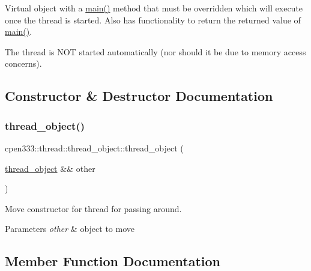 Virtual object with a \hyperlink{classcpen333_1_1thread_1_1thread__object_adbd74f6f7461d90a1c12e8078aa5f3af}{main()} method that must be overridden which will execute once the thread is started. Also has functionality to return the returned value of \hyperlink{classcpen333_1_1thread_1_1thread__object_adbd74f6f7461d90a1c12e8078aa5f3af}{main()}.

The thread is N\+OT started automatically (nor should it be due to memory access concerns). 

\subsection{Constructor \& Destructor Documentation}
\mbox{\label{classcpen333_1_1thread_1_1thread__object_adb6e805de4cf351471b100fe18254255}} 
\subsubsection{\texorpdfstring{thread\+\_\+object()}{thread\_object()}}
{\footnotesize\ttfamily cpen333\+::thread\+::thread\+\_\+object\+::thread\+\_\+object (\begin{DoxyParamCaption}\item[{\hyperlink{classcpen333_1_1thread_1_1thread__object}{thread\+\_\+object} \&\&}]{other }\end{DoxyParamCaption})\hspace{0.3cm}{\ttfamily [inline]}}



Move constructor for thread for passing around. 


\begin{DoxyParams}{Parameters}
{\em other} & object to move \\
\hline
\end{DoxyParams}


\subsection{Member Function Documentation}
\mbox{\label{classcpen333_1_1thread_1_1thread__object_ac7334918eabfcf855cec00ed2a68a039}} 
